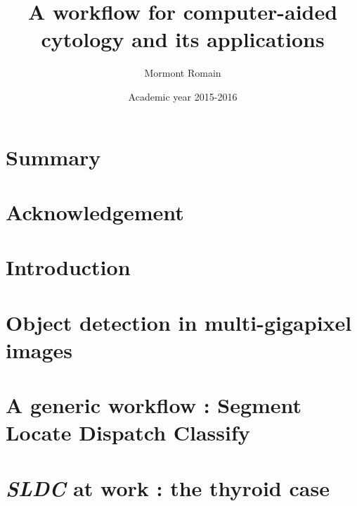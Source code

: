 \documentclass[a4paper,12pt]{report}
\author{Mormont Romain}
\title{A workflow for computer-aided cytology and its applications}
\date{Academic year 2015-2016}
\begin{document}
	
	
	
	\newpage
	
	\clearpage
	\setcounter{page}{1}
	\tableofcontents
	
	\newpage

	\chapter*{Summary}
	
	\newpage
	
	\chapter*{Acknowledgement}
	
	\newpage
	
	\chapter{Introduction}
	
	\newpage
	
	\chapter{Object detection in multi-gigapixel images}
	
	\newpage
	
	\chapter{A generic workflow : Segment Locate Dispatch Classify}
	
	\newpage
	
	\chapter{\textit{SLDC} at work : the thyroid case}
	
	\newpage
	
\end{document}
